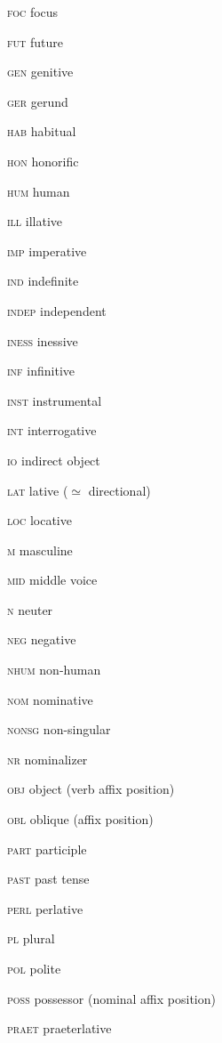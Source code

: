 \begin{refsection}
\begin{multicols}{2}
	\textsc{foc}  focus
	
	\textsc{fut}  future
	
	\textsc{gen}  genitive

	
	\textsc{ger}  gerund
	
	\textsc{hab}  habitual
	
	\textsc{hon}  honorific
	
	\textsc{hum}  human
	
	\textsc{ill}  illative
	
	\textsc{imp}  imperative
	
	\textsc{ind}  indefinite
	
	\textsc{indep}  independent
	
	\textsc{iness}  inessive
	
	\textsc{inf}  infinitive
	
	\textsc{inst}  instrumental
	
	\textsc{int}  interrogative
	
	\textsc{io}  indirect object
	
	\textsc{lat}  lative (${\simeq}$ directional)
	
	\textsc{loc}  locative
	
	\textsc{m}  masculine
	
	\textsc{mid}  middle voice
	
	\textsc{n}  neuter
	
	\textsc{neg}  negative
	
	\textsc{nhum}  non-human
	
	\textsc{nom}  nominative
	
	\textsc{nonsg}  non-singular
	
	\textsc{nr}  nominalizer
	
	\textsc{obj}  object (verb affix position)
	
	\textsc{obl}  oblique (affix position)
	
	\textsc{part}  participle
	
	\textsc{past}  past tense
	
	\textsc{perl}  perlative
	
	\textsc{pl}  plural
	
	\textsc{pol}  polite
	
	\textsc{poss}  possessor (nominal affix position)
	
	\textsc{praet}  praeterlative
	

\end{multicols}
\end{refsection}
